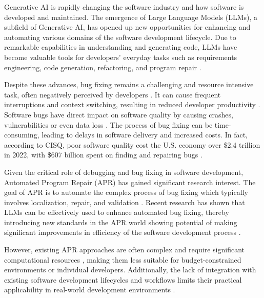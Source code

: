 Generative AI is rapidly changing the software industry and how software is developed and maintained. The emergence of Large Language Models (LLMs), a subfield of Generative AI, has opened up new opportunities for enhancing and automating various domains of the software development lifecycle. Due to remarkable capabilities in understanding and generating code, LLMs have become valuable tools for developers' everyday tasks such as requirements engineering, code generation, refactoring, and program repair \cite{houLargeLanguageModels2024, puvvadiCodingAgentsComprehensive2025}.

Despite these advances, bug fixing remains a challenging and resource intensive task, often negatively perceived by developers  \cite{winterHowDevelopersReally2023}. It can cause frequent interruptions and context switching, resulting in reduced developer productivity  \cite{vasilescuSkyNotLimit2016}.
Software bugs have direct impact on software quality by causing crashes, vulnerabilities or even data loss \cite{tihanyiNewEraSoftware2024}.
The process of bug fixing can be time-consuming, leading to delays in software delivery and increased costs. %
In fact, according to CISQ, poor software quality cost the U.S. economy over \$2.4 trillion in 2022, with \$607 billion spent on finding and repairing bugs \cite{CostPoorSoftware}.

Given the critical role of debugging and bug fixing in software development, Automated Program Repair (APR) has gained significant research interest. The goal of APR is to automate the complex process of bug fixing \cite{houLargeLanguageModels2024} which typically involves localization, repair, and validation \cite{zhangEmpiricalStudyFactors2012, leeUnifiedDebuggingApproach2024,xiaAgentlessDemystifyingLLMbased2024,zhangPATCHEmpoweringLarge2025, wangEmpiricalResearchUtilizing2025}.
Recent research has shown that LLMs can be effectively used to enhance automated bug fixing, thereby introducing new standards in the APR world showing potential of making significant improvements in efficiency of the software development process \cite{xiaAgentlessDemystifyingLLMbased2024,liuMarsCodeAgentAInative2024,yangSWEagentAgentComputerInterfaces2024, sobaniaAnalysisAutomaticBug2023, xiaAutomatedProgramRepair2024, huCanGPTO1Kill2024}.

However, existing APR approaches are often complex and require significant computational resources \cite{rondonEvaluatingAgentbasedProgram2025}, making them less suitable for budget-constrained environments or individual developers. Additionally, the lack of integration with existing software development lifecycles and workflows limits their practical applicability in real-world development environments \cite{chenUnveilingPitfallsUnderstanding2025,liuMarsCodeAgentAInative2024}.

